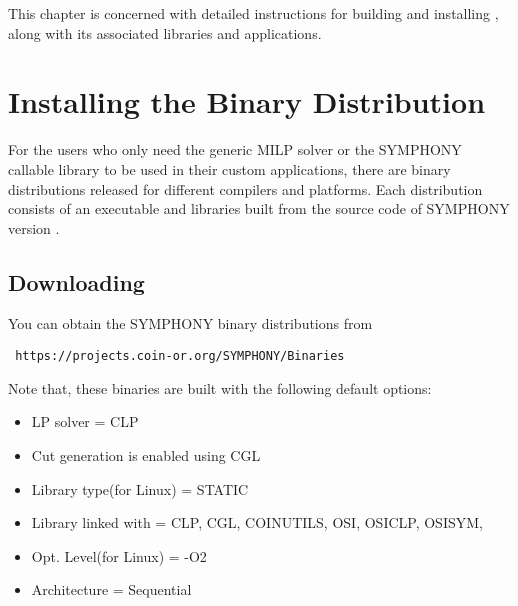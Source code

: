 
This chapter is concerned with detailed instructions for building and
installing \BB, along with its associated libraries and applications.

\section{Installing the Binary Distribution}

For the users who only need the generic MILP solver or the SYMPHONY 
callable library to be used in their custom applications, there are 
binary distributions released for different compilers and platforms. 
Each distribution consists of an executable and libraries built from the 
source code of SYMPHONY version \VER.
 
\subsection{Downloading}
You can obtain the SYMPHONY binary distributions from 
{\color{Brown}
\begin{verbatim}
 https://projects.coin-or.org/SYMPHONY/Binaries
\end{verbatim}
}

Note that, these binaries are built with the following default options:
\begin{itemize}
\item LP solver = CLP
\item Cut generation is enabled using CGL
\item Library type(for Linux) = STATIC
\item Library linked with = CLP, CGL, COINUTILS, OSI, OSICLP, OSISYM, 
\item Opt. Level(for Linux) = -O2 
\item Architecture = Sequential
\end{itemize} 

